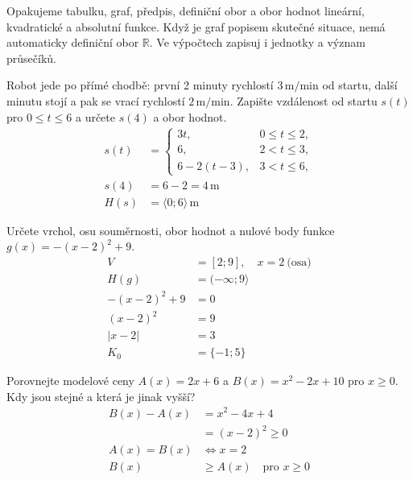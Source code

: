 \documentclass[11pt,a4paper]{article}
\begin{document}
Opakujeme tabulku, graf, předpis, definiční obor a obor hodnot lineární, kvadratické a absolutní funkce. Když je graf popisem skutečné situace, nemá automaticky definiční obor $\mathbb R$. Ve výpočtech zapisuj i jednotky a význam průsečíků.
\begin{prikladReseniBox}[title={Příklad 1}]
Robot jede po přímé chodbě: první 2 minuty rychlostí $3\,\mathrm{m/min}$ od startu, další minutu stojí a pak se vrací rychlostí $2\,\mathrm{m/min}$. Zapište vzdálenost od startu $s(t)$ pro $0\le t\le6$ a určete $s(4)$ a obor hodnot.
\tcblower
\[
\begin{aligned}
s(t)&=\begin{cases}3t,&0\le t\le2,\\6,&2<t\le3,\\6-2(t-3),&3<t\le6,\end{cases}\\
s(4)&=6-2=4\,\mathrm m\\
H(s)&=\langle0;6\rangle\,\mathrm m
\end{aligned}
\]


\begin{center}
\end{center}
\end{prikladReseniBox}
\begin{prikladReseniBox}[title={Příklad 2}]
Určete vrchol, osu souměrnosti, obor hodnot a nulové body funkce $g(x)=-(x-2)^2+9$.
\tcblower
\[
\begin{aligned}
V&=[2;9],\quad x=2\ \text{(osa)}\\
H(g)&=(-\infty;9\rangle\\
-(x-2)^2+9&=0\\
(x-2)^2&=9\\
|x-2|&=3\\
K_0&=\{-1;5\}
\end{aligned}
\]

\end{prikladReseniBox}
\begin{prikladReseniBox}[title={Příklad 3}]
Porovnejte modelové ceny $A(x)=2x+6$ a $B(x)=x^2-2x+10$ pro $x\ge0$. Kdy jsou stejné a která je jinak vyšší?
\tcblower
\[
\begin{aligned}
B(x)-A(x)&=x^2-4x+4\\
&=(x-2)^2\ge0\\
A(x)=B(x)&\Leftrightarrow x=2\\
B(x)&\ge A(x)\quad\text{pro }x\ge0
\end{aligned}
\]

\end{prikladReseniBox}
\end{document}
